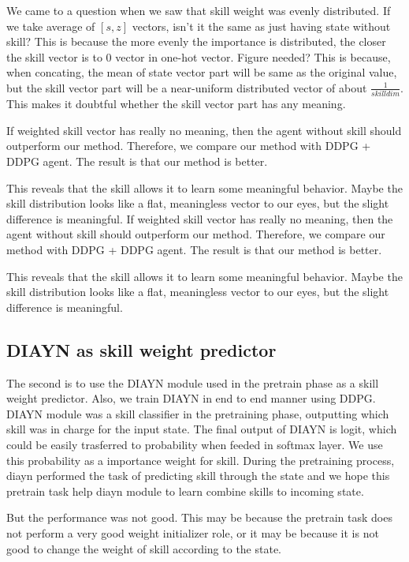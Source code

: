 We came to a question when we saw that skill weight was evenly distributed.
If we take average of ${[s,z]}$ vectors, isn't it the same as just having state without skill?
This is because the more evenly the importance is distributed, the closer the skill vector is to 0 vector in one-hot vector. Figure needed?
This is because, when concating, the mean of state vector part will be same as the original value,
but the skill vector part will be a near-uniform distributed vector of about $\frac{1}{skilldim}$.
This makes it doubtful whether the skill vector part has any meaning.

If weighted skill vector has really no meaning, then the agent without skill should outperform our method.
Therefore, we compare our method with DDPG + DDPG agent. The result is that our method is better.

This reveals that the skill allows it to learn some meaningful behavior.
Maybe the skill distribution looks like a flat, meaningless vector to our eyes, but the slight difference is meaningful.
If weighted skill vector has really no meaning, then the agent without skill should outperform our method.
Therefore, we compare our method with DDPG + DDPG agent. The result is that our method is better.

This reveals that the skill allows it to learn some meaningful behavior.
Maybe the skill distribution looks like a flat, meaningless vector to our eyes, but the slight difference is meaningful.

\subsection{DIAYN as skill weight predictor}
The second is to use the DIAYN module used in the pretrain phase as a skill weight predictor.
Also, we train DIAYN in end to end manner using DDPG.
DIAYN module was a skill classifier in the pretraining phase, outputting which skill was in charge for the input state.
The final output of DIAYN is logit, which could be easily trasferred to probability when feeded in softmax layer.
We use this probability as a importance weight for skill. 
During the pretraining process, diayn performed the task of predicting skill through the state and we hope 
this pretrain task help diayn module to learn combine skills  to incoming state.

 But the performance was not good. This may be because the pretrain task does not perform a very good weight initializer role,
 or it may be because it is not good to change the weight of skill according to the state.

